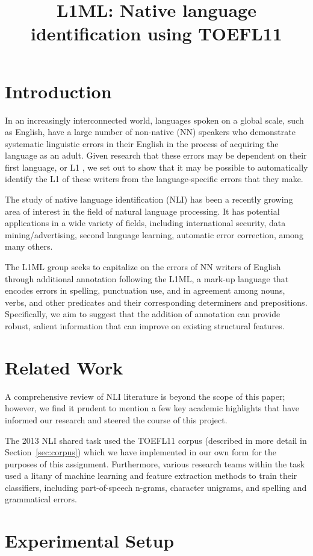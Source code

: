 \documentclass[10pt, a4paper]{article}
\title{L1ML: Native language identification using TOEFL11}
\begin{document}
\maketitleabstract

\section{Introduction}
In an increasingly interconnected world, languages spoken on a global scale, such as English, have a large number of non-native (NN) speakers who demonstrate systematic linguistic errors in their English in the process of acquiring the language as an adult. Given research that these errors may be dependent on their first language, or L1 \cite{Tetreault-2013}, we set out to show that it may be possible to automatically identify the L1 of these writers from the language-specific errors that they make. 

The study of native language identification (NLI) has been a recently growing area of interest in the field of natural language processing. It has potential applications in a wide variety of fields, including international security, data mining/advertising, second language learning, automatic error correction, among many others.

The L1ML group seeks to capitalize on the errors of NN writers of English through additional annotation following the L1ML, a mark-up language that encodes errors in spelling, punctuation use, and in agreement among nouns, verbs, and other predicates and their corresponding determiners and prepositions. Specifically, we aim to suggest that the addition of annotation can provide robust, salient information that can improve on existing structural features.

\section{Related Work}
A comprehensive review of NLI literature is beyond the scope of this paper; however, we find it prudent to mention a few key academic highlights that have informed our research and steered the course of this project. 

The 2013 NLI shared task used the TOEFL11 corpus (described in more detail in Section~\ref{sec:corpus}) which we have implemented in our own form for the purposes of this assignment. Furthermore, various research teams within the task used a litany of machine learning and feature extraction methods to train their classifiers, including part-of-speech n-grams, character unigrams, and spelling and grammatical errors. 

\section{Experimental Setup}
\end{document}
